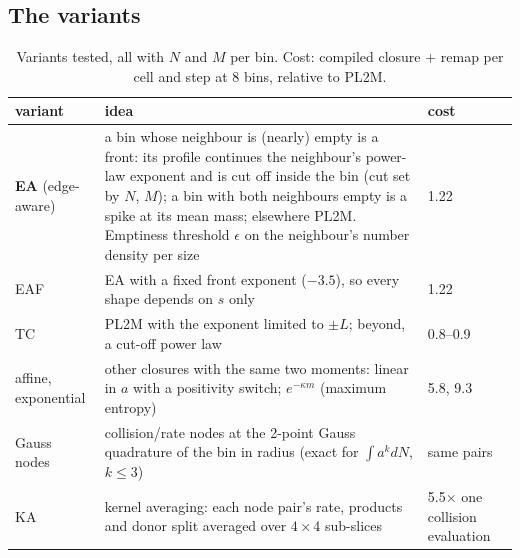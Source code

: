 \documentclass[11pt,a4paper]{article}
\begin{document}
\subsection{The variants}
\begin{table}[H]
\centering\small
\caption{Variants tested, all with $N$ and $M$ per bin. Cost: compiled closure + remap per cell and step at 8 bins,
relative to PL2M.}\label{tab:variants}
\begin{tabularx}{\textwidth}{@{}l L l@{}}
\toprule
variant & idea & cost \\
\midrule
\textbf{EA} (edge-aware) & a bin whose neighbour is (nearly) empty is a front: its profile continues the neighbour's
  power-law exponent and is cut off inside the bin (cut set by $N$, $M$); a bin with both neighbours empty is a spike at
  its mean mass; elsewhere PL2M. Emptiness threshold $\epsilon$ on the neighbour's number density per size & 1.22 \\
EAF & EA with a fixed front exponent ($-3.5$), so every shape depends on $s$ only & 1.22 \\
TC & PL2M with the exponent limited to $\pm L$; beyond, a cut-off power law & 0.8--0.9 \\
affine, exponential & other closures with the same two moments: linear in $a$ with a positivity switch; $e^{-\kappa m}$
  (maximum entropy) & 5.8, 9.3 \\
Gauss nodes & collision/rate nodes at the 2-point Gauss quadrature of the bin in radius (exact for $\int a^k dN$, $k\le3$)
  & same pairs \\
KA & kernel averaging: each node pair's rate, products and donor split averaged over $4\times4$ sub-slices & 5.5$\times$
  one collision evaluation \\
\bottomrule
\end{tabularx}
\end{table}
\end{document}
